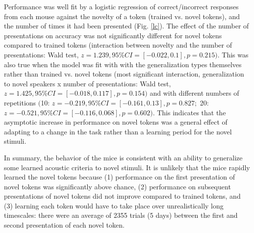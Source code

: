Performance was well fit by a logistic regression of correct/incorrect responses from each mouse against the novelty of a token (trained vs. novel tokens), and the number of times it had been presented (Fig. \ref{lc}). The effect of the number of presentations on accuracy was not significantly different for novel tokens compared to trained tokens (interaction between novelty and the number of presentations: Wald test, $z = 1.239, 95\% CI = [-0.022, 0.1], p=0.215)$. This was also true when the model was fit with with the generalization types themselves rather than trained vs. novel tokens (most significant interaction, generalization to novel speakers x number of presentations: Wald test, $z = 1.425, 95\% CI = [-0.018, 0.117], p=0.154)$ and with different numbers of repetitions $($10: $z = -0.219, 95\% CI = [-0.161, 0.13], p=0.827;$ 20: $z = -0.521, 95\% CI = [-0.116, 0.068], p=0.602)$. This indicates that the asymptotic increase in performance on novel tokens was a general effect of adapting to a change in the task rather than a learning period for the novel stimuli.

In summary, the behavior of the mice is consistent with an ability to generalize some learned acoustic criteria to novel stimuli. It is unlikely that the mice rapidly learned the novel tokens because (1) performance on the first presentation of novel tokens was significantly above chance, (2) performance on subsequent presentations of novel tokens did not improve compared to trained tokens, and (3) learning each token would have to take place over unrealistically long timescales: there were an average of 2355 trials (5 days) between the first and second presentation of each novel token.

